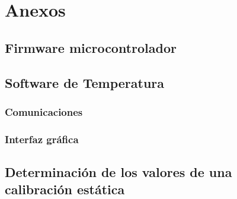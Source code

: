 
%




\chapter{Anexos}
	\section{Firmware microcontrolador}
		
	
	\section{Software de Temperatura}
		\subsection{Comunicaciones}
			
			
		\subsection{Interfaz gr\'afica}
			
			
	\section{Determinación de los valores de una calibración estática}\label{anx: staticCalibration}
		